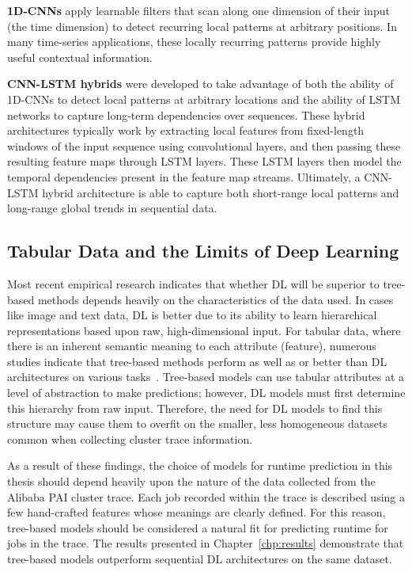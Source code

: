 \textbf{1D-CNNs} apply learnable filters that scan along one dimension of their input (the time dimension) to detect recurring local patterns at arbitrary positions. In many time-series applications, these locally recurring patterns provide highly useful contextual information.

\textbf{CNN-LSTM hybrids} were developed to take advantage of both the ability of 1D-CNNs to detect local patterns at arbitrary locations and the ability of LSTM networks to capture long-term dependencies over sequences. These hybrid architectures typically work by extracting local features from fixed-length windows of the input sequence using convolutional layers, and then passing these resulting feature maps through LSTM layers. These LSTM layers then model the temporal dependencies present in the feature map streams. Ultimately, a CNN-LSTM hybrid architecture is able to capture both short-range local patterns and long-range global trends in sequential data.

\newpage
\subsection{Tabular Data and the Limits of Deep Learning}

Most recent empirical research indicates that whether DL will be superior to tree-based methods depends heavily on the characteristics of the data used. In cases like image and text data, DL is better due to its ability to learn hierarchical representations based upon raw, high-dimensional input. For tabular data, where there is an inherent semantic meaning to each attribute (feature), numerous studies indicate that tree-based methods perform as well as or better than DL architectures on various tasks~\cite{shwartzziv2022tabular,grinsztajn2022tree}. Tree-based models can use tabular attributes at a level of abstraction to make predictions; however, DL models must first determine this hierarchy from raw input. Therefore, the need for DL models to find this structure may cause them to overfit on the smaller, less homogeneous datasets common when collecting cluster trace information.

As a result of these findings, the choice of models for runtime prediction in this thesis should depend heavily upon the nature of the data collected from the Alibaba PAI cluster trace. Each job recorded within the trace is described using a few hand-crafted features whose meanings are clearly defined. For this reason, tree-based models should be considered a natural fit for predicting runtime for jobs in the trace. The results presented in Chapter~\ref{chp:results} demonstrate that tree-based models outperform sequential DL architectures on the same dataset.

